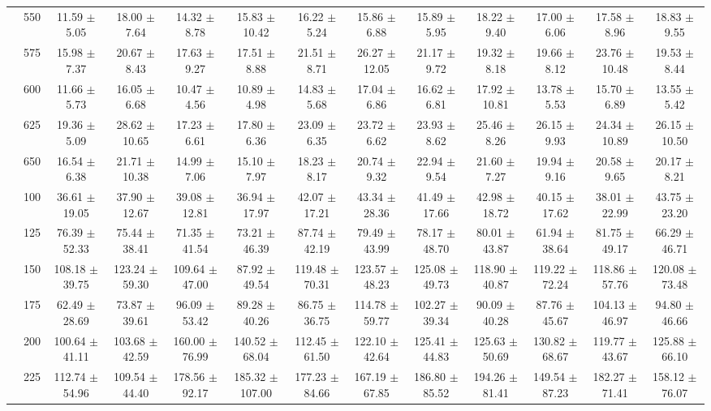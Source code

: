 \begin{table}[h]
{\begin{tabular}{
        ccccccccccccc}
 & 550& 11.59 $\pm$ 5.05& 18.00 $\pm$ 7.64& 14.32 $\pm$ 8.78& 15.83 $\pm$ 10.42& 16.22 $\pm$ 5.24& 15.86 $\pm$ 6.88& 15.89 $\pm$ 5.95& 18.22 $\pm$ 9.40& 17.00 $\pm$ 6.06& 17.58 $\pm$ 8.96& 18.83 $\pm$ 9.55 \\ 
 & 575& 15.98 $\pm$ 7.37& 20.67 $\pm$ 8.43& 17.63 $\pm$ 9.27& 17.51 $\pm$ 8.88& 21.51 $\pm$ 8.71& 26.27 $\pm$ 12.05& 21.17 $\pm$ 9.72& 19.32 $\pm$ 8.18& 19.66 $\pm$ 8.12& 23.76 $\pm$ 10.48& 19.53 $\pm$ 8.44 \\ 
 & 600& 11.66 $\pm$ 5.73& 16.05 $\pm$ 6.68& 10.47 $\pm$ 4.56& 10.89 $\pm$ 4.98& 14.83 $\pm$ 5.68& 17.04 $\pm$ 6.86& 16.62 $\pm$ 6.81& 17.92 $\pm$ 10.81& 13.78 $\pm$ 5.53& 15.70 $\pm$ 6.89& 13.55 $\pm$ 5.42 \\ 
 & 625& 19.36 $\pm$ 5.09& 28.62 $\pm$ 10.65& 17.23 $\pm$ 6.61& 17.80 $\pm$ 6.36& 23.09 $\pm$ 6.35& 23.72 $\pm$ 6.62& 23.93 $\pm$ 8.62& 25.46 $\pm$ 8.26& 26.15 $\pm$ 9.93& 24.34 $\pm$ 10.89& 26.15 $\pm$ 10.50 \\ 
 & 650& 16.54 $\pm$ 6.38& 21.71 $\pm$ 10.38& 14.99 $\pm$ 7.06& 15.10 $\pm$ 7.97& 18.23 $\pm$ 8.17& 20.74 $\pm$ 9.32& 22.94 $\pm$ 9.54& 21.60 $\pm$ 7.27& 19.94 $\pm$ 9.16& 20.58 $\pm$ 9.65& 20.17 $\pm$ 8.21 \\ \hline 
 & 100& 36.61 $\pm$ 19.05& 37.90 $\pm$ 12.67& 39.08 $\pm$ 12.81& 36.94 $\pm$ 17.97& 42.07 $\pm$ 17.21& 43.34 $\pm$ 28.36& 41.49 $\pm$ 17.66& 42.98 $\pm$ 18.72& 40.15 $\pm$ 17.62& 38.01 $\pm$ 22.99& 43.75 $\pm$ 23.20 \\ 
 & 125& 76.39 $\pm$ 52.33& 75.44 $\pm$ 38.41& 71.35 $\pm$ 41.54& 73.21 $\pm$ 46.39& 87.74 $\pm$ 42.19& 79.49 $\pm$ 43.99& 78.17 $\pm$ 48.70& 80.01 $\pm$ 43.87& 61.94 $\pm$ 38.64& 81.75 $\pm$ 49.17& 66.29 $\pm$ 46.71 \\ 
 & 150& 108.18 $\pm$ 39.75& 123.24 $\pm$ 59.30& 109.64 $\pm$ 47.00& 87.92 $\pm$ 49.54& 119.48 $\pm$ 70.31& 123.57 $\pm$ 48.23& 125.08 $\pm$ 49.73& 118.90 $\pm$ 40.87& 119.22 $\pm$ 72.24& 118.86 $\pm$ 57.76& 120.08 $\pm$ 73.48 \\ 
 & 175& 62.49 $\pm$ 28.69& 73.87 $\pm$ 39.61& 96.09 $\pm$ 53.42& 89.28 $\pm$ 40.26& 86.75 $\pm$ 36.75& 114.78 $\pm$ 59.77& 102.27 $\pm$ 39.34& 90.09 $\pm$ 40.28& 87.76 $\pm$ 45.67& 104.13 $\pm$ 46.97& 94.80 $\pm$ 46.66 \\ 
 & 200& 100.64 $\pm$ 41.11& 103.68 $\pm$ 42.59& 160.00 $\pm$ 76.99& 140.52 $\pm$ 68.04& 112.45 $\pm$ 61.50& 122.10 $\pm$ 42.64& 125.41 $\pm$ 44.83& 125.63 $\pm$ 50.69& 130.82 $\pm$ 68.67& 119.77 $\pm$ 43.67& 125.88 $\pm$ 66.10 \\ 
 & 225& 112.74 $\pm$ 54.96& 109.54 $\pm$ 44.40& 178.56 $\pm$ 92.17& 185.32 $\pm$ 107.00& 177.23 $\pm$ 84.66& 167.19 $\pm$ 67.85& 186.80 $\pm$ 85.52& 194.26 $\pm$ 81.41& 149.54 $\pm$ 87.23& 182.27 $\pm$ 71.41& 158.12 $\pm$ 76.07 \\ 

\end{tabular}}
\end{table}
